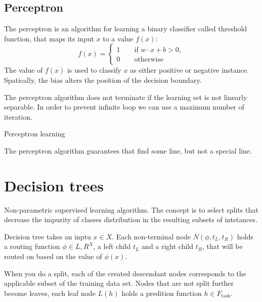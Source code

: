 \documentclass[a4paper,6pt,twocolumn,fleqn]{article}
\begin{document}
\subsection{Perceptron} %
The perceptron is an algorithm for learning a binary classifier called threshold function, that maps its input \(x\) to a value \(f(x)\):
\begin{equation}
    f(x) = \begin{cases}
        1 \qquad \text{if } w \cdot x + b > 0,\\
        0 \qquad \text{otherwise}
    \end{cases}
\end{equation}
The value of \(f(x)\) is used to classify \(x\) as either positive or negative instance. Spatically, the bias alters the position of the decision boundary.

The perceptron algorithm does not terminate if the learning set is not linearly separable. In order to prevent infinite loop we can use a maximum number of iteration.

\begin{algorithm}[h!]
\caption{Perceptron learning}
\label{alg:perceptron}
\end{algorithm}
The perceptron algorithm guarantees that find some line, but not a special line.

\section{Decision trees}
Non-parametric supervised learning algorithm. The concept is to select splits that decrease the impurity of classes distribution in the resulting subsets of intstances.

Decision tree takes an inptu \(x \in X\). Each non-terminal node \(N(\phi,t_L,t_R)\) holds a routing function \(\phi \in {L,R}^X\), a left child \(t_L\) and a right child \(t_R\), that will be routed on based on the value of \(\phi(x)\).

When you do a split, each of the created descendant nodes corresponds to the applicable subset of the training data set. Nodes that are not split further become leaves, each leaf node \(L(h)\) holds a predition function \(h \in F_\text{task}\).
\end{document}
